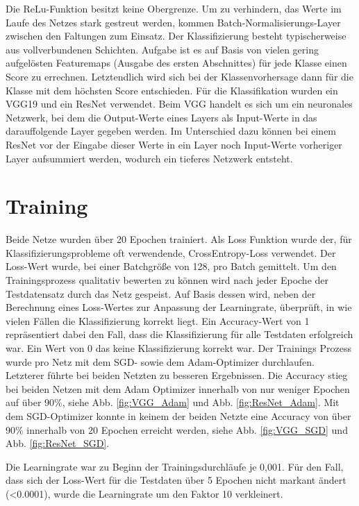 \documentclass[sigconf]{acmart}
\begin{document}
Die ReLu-Funktion besitzt keine Obergrenze. Um zu verhindern, das Werte im Laufe des Netzes stark gestreut werden, kommen Batch-Normalisierungs-Layer zwischen den Faltungen zum Einsatz. 
Der Klassifizierung besteht typischerweise aus vollverbundenen Schichten. Aufgabe ist es auf Basis von vielen gering aufgelösten Featuremaps (Ausgabe des ersten Abschnittes) für jede Klasse einen Score zu errechnen. Letztendlich wird sich bei der Klassenvorhersage dann für die Klasse mit dem höchsten Score entschieden. 
Für die Klassifikation wurden ein VGG19 und ein ResNet verwendet. Beim VGG handelt es sich um ein neuronales Netzwerk, bei dem die Output-Werte eines Layers als Input-Werte in das darauffolgende Layer gegeben werden. Im Unterschied dazu können bei einem ResNet vor der Eingabe dieser Werte in ein Layer noch Input-Werte vorheriger Layer aufsummiert werden, wodurch ein tieferes Netzwerk entsteht. 

\section{Training}
\label{section:training}
Beide Netze wurden über 20 Epochen trainiert. Als Loss Funktion wurde der, für Klassifizierungsprobleme oft verwendende, CrossEntropy-Loss verwendet. Der Loss-Wert wurde, bei einer Batchgröße von 128, pro Batch gemittelt.  
Um den Trainingsprozess qualitativ bewerten zu können wird nach jeder Epoche der Testdatensatz durch das Netz gespeist. Auf Basis dessen wird, neben der Berechnung eines Loss-Wertes zur Anpassung der Learningrate, überprüft, in wie vielen Fällen die Klassifizierung korrekt liegt.  Ein Accuracy-Wert von 1 repräsentiert dabei den Fall, dass die Klassifizierung für alle Testdaten erfolgreich war. Ein Wert von 0 das keine Klassifizierung korrekt war. 
Der Trainings Prozess wurde pro Netz mit dem SGD- sowie dem Adam-Optimizer durchlaufen. Letzterer führte bei beiden Netzten zu besseren Ergebnissen. Die Accuracy stieg bei beiden Netzen mit dem Adam Optimizer innerhalb von nur weniger Epochen auf über 90\%, siehe Abb. \ref{fig:VGG_Adam} und Abb. \ref{fig:ResNet_Adam}. Mit dem SGD-Optimizer konnte in keinem der beiden Netzte eine Accuracy von über 90\% innerhalb von 20 Epochen erreicht werden, siehe Abb. \ref{fig:VGG_SGD} und Abb. \ref{fig:ResNet_SGD}.

Die Learningrate war zu Beginn der Trainingsdurchläufe je 0,001. Für den Fall, dass sich der Loss-Wert für die Testdaten über 5 Epochen nicht markant ändert (<0.0001), wurde die Learningrate um den Faktor 10 verkleinert. 
\end{document}

